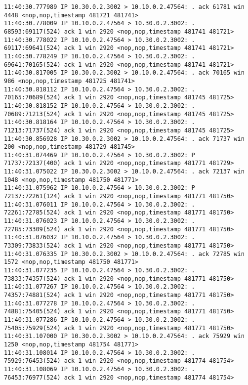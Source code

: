 \documentclass[a4paper,12pt]{article}
\begin{document}
\begin{lstlisting}
11:40:30.777989 IP 10.30.0.2.3002 > 10.10.0.2.47564: . ack 61781 win 4448 <nop,nop,timestamp 481721 481741>
11:40:30.778009 IP 10.10.0.2.47564 > 10.30.0.2.3002: . 68593:69117(524) ack 1 win 2920 <nop,nop,timestamp 481741 481721>
11:40:30.778022 IP 10.10.0.2.47564 > 10.30.0.2.3002: . 69117:69641(524) ack 1 win 2920 <nop,nop,timestamp 481741 481721>
11:40:30.778249 IP 10.10.0.2.47564 > 10.30.0.2.3002: . 69641:70165(524) ack 1 win 2920 <nop,nop,timestamp 481741 481721>
11:40:30.817005 IP 10.30.0.2.3002 > 10.10.0.2.47564: . ack 70165 win 986 <nop,nop,timestamp 481725 481741>
11:40:30.818112 IP 10.10.0.2.47564 > 10.30.0.2.3002: . 70165:70689(524) ack 1 win 2920 <nop,nop,timestamp 481745 481725>
11:40:30.818152 IP 10.10.0.2.47564 > 10.30.0.2.3002: . 70689:71213(524) ack 1 win 2920 <nop,nop,timestamp 481745 481725>
11:40:30.818164 IP 10.10.0.2.47564 > 10.30.0.2.3002: . 71213:71737(524) ack 1 win 2920 <nop,nop,timestamp 481745 481725>
11:40:30.856928 IP 10.30.0.2.3002 > 10.10.0.2.47564: . ack 71737 win 200 <nop,nop,timestamp 481729 481745>
11:40:31.074469 IP 10.10.0.2.47564 > 10.30.0.2.3002: P 71737:72137(400) ack 1 win 2920 <nop,nop,timestamp 481771 481729>
11:40:31.075022 IP 10.30.0.2.3002 > 10.10.0.2.47564: . ack 72137 win 1048 <nop,nop,timestamp 481750 481771>
11:40:31.075962 IP 10.10.0.2.47564 > 10.30.0.2.3002: P 72137:72261(124) ack 1 win 2920 <nop,nop,timestamp 481771 481750>
11:40:31.076011 IP 10.10.0.2.47564 > 10.30.0.2.3002: . 72261:72785(524) ack 1 win 2920 <nop,nop,timestamp 481771 481750>
11:40:31.076023 IP 10.10.0.2.47564 > 10.30.0.2.3002: . 72785:73309(524) ack 1 win 2920 <nop,nop,timestamp 481771 481750>
11:40:31.076032 IP 10.10.0.2.47564 > 10.30.0.2.3002: . 73309:73833(524) ack 1 win 2920 <nop,nop,timestamp 481771 481750>
11:40:31.076335 IP 10.30.0.2.3002 > 10.10.0.2.47564: . ack 72785 win 1572 <nop,nop,timestamp 481750 481771>
11:40:31.077235 IP 10.10.0.2.47564 > 10.30.0.2.3002: . 73833:74357(524) ack 1 win 2920 <nop,nop,timestamp 481771 481750>
11:40:31.077267 IP 10.10.0.2.47564 > 10.30.0.2.3002: . 74357:74881(524) ack 1 win 2920 <nop,nop,timestamp 481771 481750>
11:40:31.077278 IP 10.10.0.2.47564 > 10.30.0.2.3002: . 74881:75405(524) ack 1 win 2920 <nop,nop,timestamp 481771 481750>
11:40:31.077286 IP 10.10.0.2.47564 > 10.30.0.2.3002: . 75405:75929(524) ack 1 win 2920 <nop,nop,timestamp 481771 481750>
11:40:31.107000 IP 10.30.0.2.3002 > 10.10.0.2.47564: . ack 75929 win 1250 <nop,nop,timestamp 481754 481771>
11:40:31.108014 IP 10.10.0.2.47564 > 10.30.0.2.3002: . 75929:76453(524) ack 1 win 2920 <nop,nop,timestamp 481774 481754>
11:40:31.108069 IP 10.10.0.2.47564 > 10.30.0.2.3002: . 76453:76977(524) ack 1 win 2920 <nop,nop,timestamp 481774 481754>

\end{lstlisting}
\end{document}
